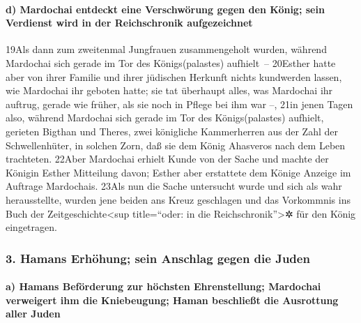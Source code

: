 \hypertarget{d-mardochai-entdeckt-eine-verschwuxf6rung-gegen-den-kuxf6nig-sein-verdienst-wird-in-der-reichschronik-aufgezeichnet}{%
\paragraph{d) Mardochai entdeckt eine Verschwörung gegen den König; sein
Verdienst wird in der Reichschronik
aufgezeichnet}\label{d-mardochai-entdeckt-eine-verschwuxf6rung-gegen-den-kuxf6nig-sein-verdienst-wird-in-der-reichschronik-aufgezeichnet}}

19Als dann zum zweitenmal Jungfrauen zusammengeholt wurden, während
Mardochai sich gerade im Tor des Königs(palastes) aufhielt~-- 20Esther
hatte aber von ihrer Familie und ihrer jüdischen Herkunft nichts
kundwerden lassen, wie Mardochai ihr geboten hatte; sie tat überhaupt
alles, was Mardochai ihr auftrug, gerade wie früher, als sie noch in
Pflege bei ihm war --, 21in jenen Tagen also, während Mardochai sich
gerade im Tor des Königs(palastes) aufhielt, gerieten Bigthan und
Theres, zwei königliche Kammerherren aus der Zahl der Schwellenhüter, in
solchen Zorn, daß sie dem König Ahasveros nach dem Leben trachteten.
22Aber Mardochai erhielt Kunde von der Sache und machte der Königin
Esther Mitteilung davon; Esther aber erstattete dem Könige Anzeige im
Auftrage Mardochais. 23Als nun die Sache untersucht wurde und sich als
wahr herausstellte, wurden jene beiden ans Kreuz geschlagen und das
Vorkommnis ins Buch der Zeitgeschichte\textless sup title=``oder: in die
Reichschronik''\textgreater✲ für den König eingetragen.

\hypertarget{hamans-erhuxf6hung-sein-anschlag-gegen-die-juden}{%
\subsubsection{3. Hamans Erhöhung; sein Anschlag gegen die
Juden}\label{hamans-erhuxf6hung-sein-anschlag-gegen-die-juden}}

\hypertarget{a-hamans-befuxf6rderung-zur-huxf6chsten-ehrenstellung-mardochai-verweigert-ihm-die-kniebeugung-haman-beschlieuxdft-die-ausrottung-aller-juden}{%
\paragraph{a) Hamans Beförderung zur höchsten Ehrenstellung; Mardochai
verweigert ihm die Kniebeugung; Haman beschließt die Ausrottung aller
Juden}\label{a-hamans-befuxf6rderung-zur-huxf6chsten-ehrenstellung-mardochai-verweigert-ihm-die-kniebeugung-haman-beschlieuxdft-die-ausrottung-aller-juden}}

